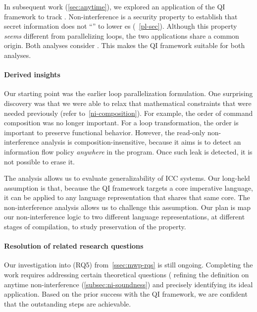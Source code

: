 In subsequent work (\autoref{sec:anytime}), we explored an application of the QI
framework to track . Non-interference is a security
property to establish that secret information does not \enquote{} to
lower es (\cf~\autoref{pl-sec}). Although this property
\emph{seems} different from parallelizing loops, the two applications share a
common origin. Both analyses consider . This makes
the QI framework suitable for both analyses.

\paragraph*{Derived insights}
Our starting point was the earlier loop parallelization formulation. One
surprising discovery was that we were able to relax that mathematical
constraints that were needed previously (refer to~\autoref{ni-composition}). For
example, the order of command composition was no longer important. For a loop
transformation, the order is important to preserve functional behavior. However,
the read-only non-interference analysis is composition-insensitive, because it
aims is to detect an information flow policy
 \emph{anywhere} in the program. Once such leak is detected, it
is not possible to erase it.

The  analysis allows us to evaluate generalizability of
ICC systems. Our long-held assumption is that, because the QI framework targets
a core imperative language, it can be applied to any language representation
that shares that same core. The non-interference analysis allows us to challenge
this assumption. Our plan is map our non-interference logic to two different
language representations, at different stages of compilation, to study
preservation of the  property.

\paragraph*{Resolution of related research questions}
Our investigation into (RQ5) from~\autoref{ssec:mwp-rqs} is still ongoing.
Completing the work requires addressing certain theoretical questions (\eg
refining the definition on anytime
non-interference (\autoref{subsec:ni-soundness})
and precisely identifying its ideal application. Based on the prior success with
the QI framework, we are confident that the outstanding steps are achievable.

